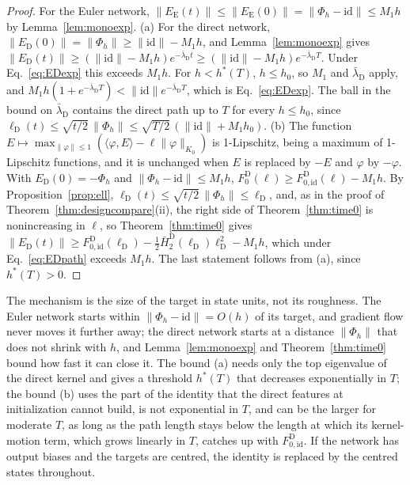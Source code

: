 \documentclass[11pt]{article}
\theoremstyle{definition}
\theoremstyle{remark}
\newcommand{\id}{\mathrm{id}}
\newcommand{\ip}[2]{\langle #1,#2\rangle}
\begin{document}
\begin{proof}
For the Euler network, $\|E_{\mathrm E}(t)\|\le\|E_{\mathrm E}(0)\| = \|\Phi_h - \id\|\le M_1h$ by Lemma~\ref{lem:monoexp}.
(a) For the direct network, $\|E_{\mathrm D}(0)\| = \|\Phi_h\|\ge\|\id\| - M_1h$, and Lemma~\ref{lem:monoexp} gives $\|E_{\mathrm D}(t)\|\ge(\|\id\| - M_1h)e^{-\bar\lambda_{\mathrm D}t}\ge(\|\id\| - M_1h)e^{-\bar\lambda_{\mathrm D}T}$.
Under Eq.~\eqref{eq:EDexp} this exceeds $M_1h$.
For $h < h^\ast(T)$, $h\le h_0$, so $M_1$ and $\bar\lambda_{\mathrm D}$ apply, and $M_1h(1 + e^{-\bar\lambda_{\mathrm D}T}) < \|\id\|e^{-\bar\lambda_{\mathrm D}T}$, which is Eq.~\eqref{eq:EDexp}.
The ball in the bound on $\bar\lambda_{\mathrm D}$ contains the direct path up to $T$ for every $h\le h_0$, since $\ell_{\mathrm D}(t)\le\sqrt{t/2}\,\|\Phi_h\|\le\sqrt{T/2}\,(\|\id\| + M_1h_0)$.
(b) The function $E\mapsto\max_{\|\varphi\|\le1}(\ip{\varphi}{E} - \ell\|\varphi\|_{K_0})$ is 1-Lipschitz, being a maximum of 1-Lipschitz functions, and it is unchanged when $E$ is replaced by $-E$ and $\varphi$ by $-\varphi$.
With $E_{\mathrm D}(0) = -\Phi_h$ and $\|\Phi_h - \id\|\le M_1h$, $F_0^{\mathrm D}(\ell)\ge F_{0,\id}^{\mathrm D}(\ell) - M_1h$.
By Proposition~\ref{prop:ell}, $\ell_{\mathrm D}(t)\le\sqrt{t/2}\,\|\Phi_h\|\le\ell_{\mathrm D}$, and, as in the proof of Theorem~\ref{thm:designcompare}(ii), the right side of Theorem~\ref{thm:time0} is nonincreasing in $\ell$, so Theorem~\ref{thm:time0} gives $\|E_{\mathrm D}(t)\|\ge F_{0,\id}^{\mathrm D}(\ell_{\mathrm D}) - \tfrac12\bar H_2^{\mathrm D}(\ell_{\mathrm D})\ell_{\mathrm D}^2 - M_1h$, which under Eq.~\eqref{eq:EDpath} exceeds $M_1h$.
The last statement follows from (a), since $h^\ast(T) > 0$.
\end{proof}

The mechanism is the size of the target in state units, not its roughness.
The Euler network starts within $\|\Phi_h - \id\| = O(h)$ of its target, and gradient flow never moves it further away; the direct network starts at a distance $\|\Phi_h\|$ that does not shrink with $h$, and Lemma~\ref{lem:monoexp} and Theorem~\ref{thm:time0} bound how fast it can close it.
The bound (a) needs only the top eigenvalue of the direct kernel and gives a threshold $h^\ast(T)$ that decreases exponentially in $T$; the bound (b) uses the part of the identity that the direct features at initialization cannot build, is not exponential in $T$, and can be the larger for moderate $T$, as long as the path length stays below the length at which its kernel-motion term, which grows linearly in $T$, catches up with $F_{0,\id}^{\mathrm D}$.
If the network has output biases and the targets are centred, the identity is replaced by the centred states throughout.
\end{document}
